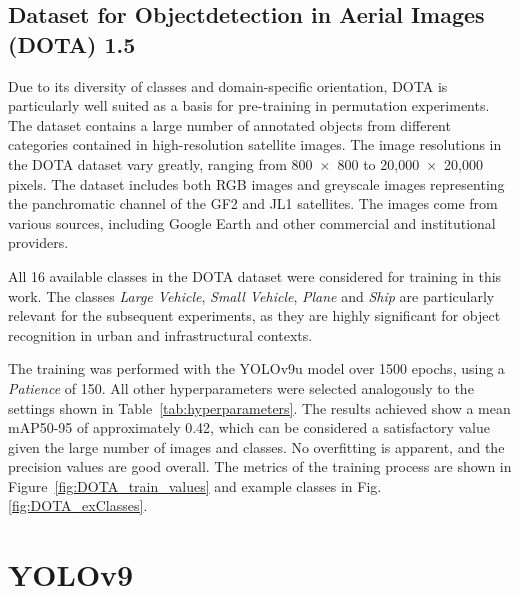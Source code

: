\subsection{Dataset for Objectdetection in Aerial Images (DOTA) 1.5}
\label{subsec:DOTA}
Due to its diversity of classes and domain-specific orientation, \Acrfull{DOTA} is particularly well suited as a basis for pre-training in permutation experiments. The dataset contains a large number of annotated objects from different categories contained in high-resolution satellite images. The image resolutions in the \acrshort{DOTA} dataset vary greatly, ranging from 800~$\times$~800 to 20,000~$\times$~20,000 pixels. The dataset includes both \acrshort{RGB} images and greyscale images representing the panchromatic channel of the GF2 and JL1 satellites. The images come from various sources, including Google Earth and other commercial and institutional providers.

All 16 available classes in the DOTA dataset were considered for training in this work. The classes \textit{Large Vehicle}, \textit{Small Vehicle}, \textit{Plane} and \textit{Ship} are particularly relevant for the subsequent experiments, as they are highly significant for object recognition in urban and infrastructural contexts.

The training was performed with the \acrshort{YOLO}v9u model over 1500 epochs, using a \textit{Patience} of 150. All other hyperparameters were selected analogously to the settings shown in Table~\ref{tab:hyperparameters}. The results achieved show a mean \acrshort{mAP}50-95 of approximately 0.42, which can be considered a satisfactory value given the large number of images and classes. No overfitting is apparent, and the precision values are good overall. The metrics of the training process are shown in Figure~\ref{fig:DOTA_train_values} and example classes in Fig. \ref{fig:DOTA_exClasses}.





\section{YOLOv9}
\label{sec:yolov9}


